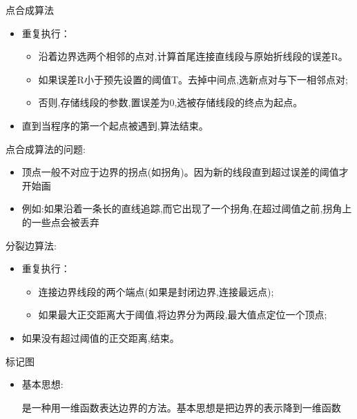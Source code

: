 \documentclass[presentation]{beamer}
\begin{document}
\begin{frame}[label={sec:orgdb02eef}]{点合成算法}
\begin{itemize}
\item 重复执行：
\begin{itemize}
\item 沿着边界选两个相邻的点对,计算首尾连接直线段与原始折线段的误差R。
\item 如果误差R小于预先设置的阈值T。去掉中间点,选新点对与下一相邻点对;
\item 否则,存储线段的参数,置误差为0,选被存储线段的终点为起点。
\end{itemize}
\item 直到当程序的第一个起点被遇到,算法结束。
\end{itemize}
\end{frame}

\begin{frame}[label={sec:orgd5dbea3}]{点合成算法的问题:}
\begin{itemize}
\item 顶点一般不对应于边界的拐点(如拐角)。因为新的线段直到超过误差的阈值才开始画
\item 例如:如果沿着一条长的直线追踪,而它出现了一个拐角,在超过阈值之前,拐角上的一些点会被丢弃
\end{itemize}
\end{frame}

\begin{frame}[label={sec:orgbe4ae2a}]{分裂边算法:}
\begin{itemize}
\item 重复执行：
\begin{itemize}
\item 连接边界线段的两个端点(如果是封闭边界,连接最远点);
\item 如果最大正交距离大于阈值,将边界分为两段,最大值点定位一个顶点;
\end{itemize}
\item 如果没有超过阈值的正交距离,结束。
\end{itemize}
\end{frame}

\begin{frame}[label={sec:org252fb92}]{标记图}
\begin{itemize}
\item 基本思想:

是一种用一维函数表达边界的方法。基本思想是把边界的表示降到一维函数
\end{itemize}
\end{frame}
\end{document}

